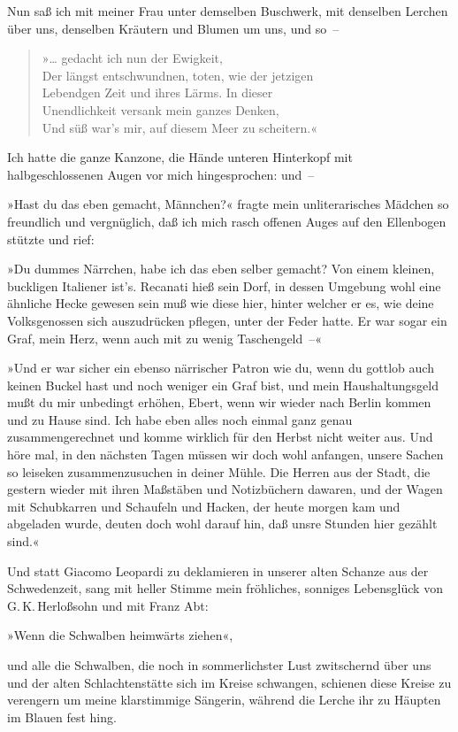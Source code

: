 Nun saß ich mit meiner Frau unter demselben Buschwerk, mit
denselben Lerchen über uns, denselben Kräutern und Blumen um uns,
und so~–

\begin{verse}
»\ldots{} gedacht ich nun der Ewigkeit,\\
Der längst entschwundnen, toten, wie der jetzigen\\
Lebendgen Zeit und ihres Lärms. In dieser\\
Unendlichkeit versank mein ganzes Denken,\\
Und süß war's mir, auf diesem Meer zu scheitern.«
\end{verse}

Ich hatte die ganze Kanzone, die Hände unteren Hinterkopf mit
halbgeschlossenen Augen vor mich hingesprochen: und~–

»Hast du das eben gemacht, Männchen?« fragte mein unliterarisches
Mädchen so freundlich und vergnüglich, daß ich mich rasch offenen
Auges auf den Ellenbogen stützte und rief:

»Du dummes Närrchen, habe ich das eben selber gemacht? Von einem
kleinen, buckligen Italiener ist's. Recanati hieß sein Dorf, in
dessen Umgebung wohl eine ähnliche Hecke gewesen sein muß wie diese
hier, hinter welcher er es, wie deine Volksgenossen sich
auszudrücken pflegen, unter der Feder hatte. Er war sogar ein Graf,
mein Herz, wenn auch mit zu wenig Taschengeld~–«

»Und er war sicher ein ebenso närrischer Patron wie du, wenn du
gottlob auch keinen Buckel hast und noch weniger ein Graf bist, und
mein Haushaltungsgeld mußt du mir unbedingt erhöhen, Ebert, wenn
wir wieder nach Berlin kommen und zu Hause sind. Ich habe eben
alles noch einmal ganz genau zusammengerechnet und komme wirklich
für den Herbst nicht weiter aus. Und höre mal, in den nächsten
Tagen müssen wir doch wohl anfangen, unsere Sachen so leiseken
zusammenzusuchen in deiner Mühle. Die Herren aus der Stadt, die
gestern wieder mit ihren Maßstäben und Notizbüchern dawaren, und
der Wagen mit Schubkarren und Schaufeln und Hacken, der heute
morgen kam und abgeladen wurde, deuten doch wohl darauf hin, daß
unsre Stunden hier gezählt sind.«

Und statt Giacomo Leopardi zu deklamieren in unserer alten Schanze
aus der Schwedenzeit, sang mit heller Stimme mein fröhliches,
sonniges Lebensglück von G.\,K.\,Herloßsohn und mit Franz Abt:

\begin{center}
»Wenn die Schwalben heimwärts ziehen«,
\end{center}
\noindent
und alle die
Schwalben, die noch in sommerlichster Lust zwitschernd über uns und
der alten Schlachtenstätte sich im Kreise schwangen, schienen diese
Kreise zu verengern um meine klarstimmige Sängerin, während die
Lerche ihr zu Häupten im Blauen fest hing.

